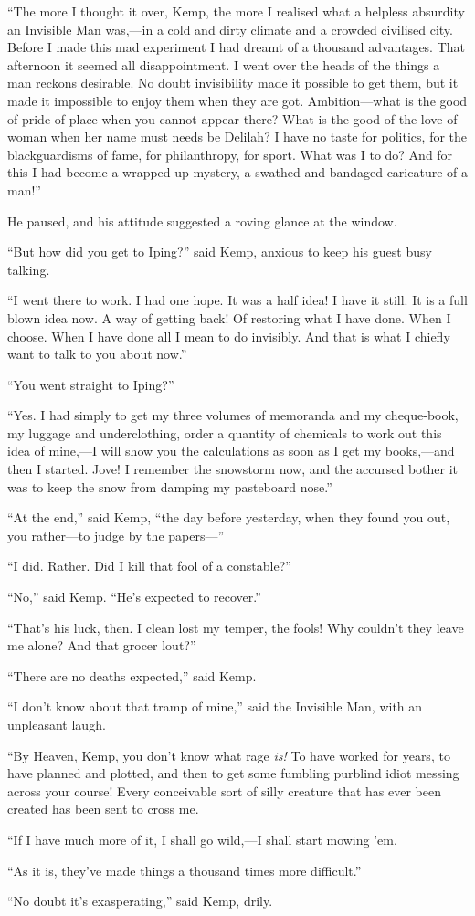 “The more I thought it over, Kemp, the more I realised what a helpless absurdity an Invisible Man was,—in a cold and dirty climate and a crowded civilised city. Before I made this mad experiment I had dreamt of a thousand advantages. That afternoon it seemed all disappointment. I went over the heads of the things a man reckons desirable. No doubt invisibility made it possible to get them, but it made it impossible to enjoy them when they are got. Ambition—what is the good of pride of place when you cannot appear there? What is the good of the love of woman when her name must needs be Delilah? I have no taste for politics, for the blackguardisms of fame, for philanthropy, for sport. What was I to do? And for this I had become a wrapped-up mystery, a swathed and bandaged caricature of a man!”

He paused, and his attitude suggested a roving glance at the window.

“But how did you get to Iping?” said Kemp, anxious to keep his guest busy talking.

“I went there to work. I had one hope. It was a half idea! I have it still. It is a full blown idea now. A way of getting back! Of restoring what I have done. When I choose. When I have done all I mean to do invisibly. And that is what I chiefly want to talk to you about now.”

“You went straight to Iping?”

“Yes. I had simply to get my three volumes of memoranda and my cheque-book, my luggage and underclothing, order a quantity of chemicals to work out this idea of mine,—I will show you the calculations as soon as I get my books,—and then I started. Jove! I remember the snowstorm now, and the accursed bother it was to keep the snow from damping my pasteboard nose.”

“At the end,” said Kemp, “the day before yesterday, when they found you out, you rather—to judge by the papers—”

“I did. Rather. Did I kill that fool of a constable?”

“No,” said Kemp. “He’s expected to recover.”

“That’s his luck, then. I clean lost my temper, the fools! Why couldn’t they leave me alone? And that grocer lout?”

“There are no deaths expected,” said Kemp.

“I don’t know about that tramp of mine,” said the Invisible Man, with an unpleasant laugh.

“By Heaven, Kemp, you don’t know what rage \emph{is!} To have worked for years, to have planned and plotted, and then to get some fumbling purblind idiot messing across your course! Every conceivable sort of silly creature that has ever been created has been sent to cross me.

“If I have much more of it, I shall go wild,—I shall start mowing ’em.

“As it is, they’ve made things a thousand times more difficult.”

“No doubt it’s exasperating,” said Kemp, drily.